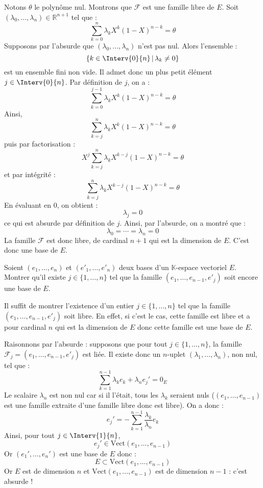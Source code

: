 \documentclass[a4paper,twoside,french,11pt]{VcCours}
\begin{document}
\corr Notons $\theta$ le polynôme nul. Montrons que $\mathcal{F}$ est une famille libre de $E$. Soit $(\lambda_0, \ldots, \lambda_n) \in \mathbb{R}^{n+1}$ tel que :
$$ \sum_{k=0}^n \lambda_k X^k (1-X)^{n-k} = \theta$$
Supposons par l'absurde que $(\lambda_0, \ldots, \lambda_n)$ n'est pas nul. Alors l'ensemble :
$$ \lbrace k \in \Interv{0}{n} \, \vert \, \lambda_k \neq 0 \rbrace$$
est un ensemble fini non vide. Il admet donc un plus petit élément $j \in \Interv{0}{n}$. Par définition de $j$, on a :
$$ \sum_{k=0}^{j-1} \lambda_k X^k (1-X)^{n-k} = \theta$$
Ainsi,
$$ \sum_{k=j}^n \lambda_k X^k (1-X)^{n-k} = \theta$$
puis par factorisation :
$$ X^j \sum_{k=j}^n \lambda_k X^{k-j} (1-X)^{n-k} = \theta$$
et par intégrité :
$$ \sum_{k=j}^n \lambda_k X^{k-j} (1-X)^{n-k} = \theta$$
En évaluant en $0$, on obtient :
$$ \lambda_j = 0$$
ce qui est absurde par définition de $j$. Ainsi, par l'absurde, on a montré que :
$$ \lambda_0 = \cdots = \lambda_n = 0$$
La famille $\mathcal{F}$ est donc libre, de cardinal $n+1$ qui est la dimension de $E$. C'est donc une base de $E$.

\begin{Exercice}{} Soient $(e_1 , \ldots ,e_n)$ et $(e'_1 , \ldots ,e'_n)$ deux bases d'un $\mathbb{K}$-espace vectoriel $E$. Montrer qu'il existe $j \in \lbrace 1, \ldots ,n \rbrace$ tel que la famille $(e_1 , \ldots ,e_{n - 1} ,e'_j)$ soit encore une base de $E$.
\end{Exercice}

\corr Il suffit de montrer l'existence d'un entier $j \in \lbrace 1, \ldots ,n \rbrace$ tel que la famille $(e_1 , \ldots ,e_{n - 1} ,e'_j)$ soit libre. En effet, si c'est le cas, cette famille est libre et a pour cardinal $n$ qui est la dimension de $E$ donc cette famille est une base de $E$.

\medskip

Raisonnons par l'absurde : supposons que pour tout $j \in \lbrace 1, \ldots ,n \rbrace$, la famille $\mathcal{F}_j=(e_1 , \ldots ,e_{n - 1} ,e'_j)$ est liée. Il existe donc un $n$-uplet $(\lambda_1, \ldots, \lambda_n)$, non nul, tel que :
$$ \sum_{k=1}^{n-1} \lambda_k e_k + \lambda_n e_j' = 0_E$$
Le scalaire $\lambda_n$ est non nul car si il l'était, tous les $\lambda_k$ seraient nuls ($(e_1, \ldots, e_{n-1})$ est une famille extraite d'une famille libre donc est libre). On a donc :
$$ e_j' = - \sum_{k=1}^{n-1} \dfrac{\lambda_k}{\lambda_n} e_k$$
Ainsi, pour tout $j \in \Interv{1}{n}$,
$$ e_j' \in \textrm{Vect}(e_1, \ldots, e_{n-1})$$
Or $(e_1', \ldots, e_n')$ est une base de $E$ donc :
$$ E \subset \textrm{Vect}(e_1, \ldots, e_{n-1})$$
Or $E$ est de dimension $n$ et $\textrm{Vect}(e_1, \ldots, e_{n-1})$ est de dimension $n-1$ : c'est absurde !
\end{document}
